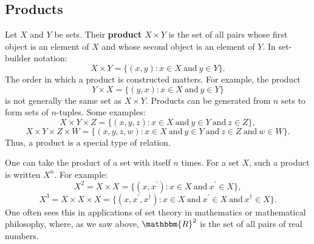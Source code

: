 \documentclass[11pt]{article}
\theoremstyle{definition}
\theoremstyle{remark}
\begin{document}
\subsection{Products}
Let $X$ and $Y$ be sets. Their \textbf{product} $X\times Y$ is the set of all pairs whose first object is an element of $X$ and whose second object is an element of $Y$. In set-builder notation:
$$X\times Y = \{(x,y): x\in X \ \text{and} \ y\in Y\}.$$
The order in which a product is constructed matters. For example, the product 
$$Y\times X = \{(y,x):x\in X \ \text{and} \ y\in Y\}$$ 
is not generally the same set as $X\times Y$. Products can be generated from $n$ sets to form sets of $n$-tuples. Some examples: 
$$X\times Y \times Z = \{(x,y,z):x\in X \ \text{and} \ y\in Y \ \text{and} \ z\in Z\},$$
$$X\times Y \times Z \times W = \{(x,y,z,w):x\in X \ \text{and} \ y\in Y \ \text{and} \ z\in Z \ \text{and} \ w\in W\}.$$
Thus, a product is a special type of relation.\par

One can take the product of a set with itself $n$ times. For a set $X$, such a product is written $X^{n}$. For example:
$$X^{2} = X\times X = \{(x,x^{\prime}):x\in X \ \text{and} \ x^{\prime}\in X\},$$
$$X^{3} = X\times X\times X = \{(x,x^{\prime},x^{\dagger}):x\in X \ \text{and} \ x^{\prime}\in X \ \text{and} \ x^{\dagger}\in X\}.$$
One often sees this in applications of set theory in mathematics or mathematical philosophy, where, as we saw above, $\mathbbm{R}^{2}$ is the set of all pairs of real numbers.
\end{document}
